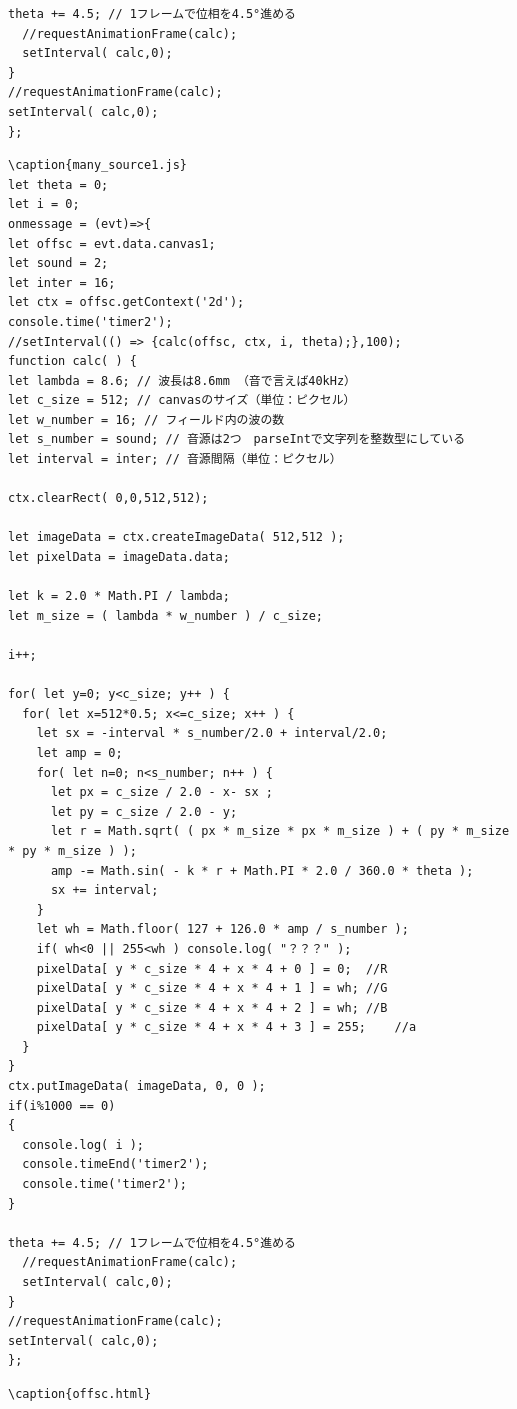 \documentclass[a4j,12pt]{jsarticle}
\begin{document}
{\begin{lstlisting}
theta += 4.5; // 1フレームで位相を4.5°進める
  //requestAnimationFrame(calc);
  setInterval( calc,0);
}
//requestAnimationFrame(calc);
setInterval( calc,0);
};

\end{lstlisting}
\newpage

\begin{lstlisting}
\caption{many_source1.js}
let theta = 0;
let i = 0;
onmessage = (evt)=>{
let offsc = evt.data.canvas1;
let sound = 2;
let inter = 16;
let ctx = offsc.getContext('2d');
console.time('timer2');
//setInterval(() => {calc(offsc, ctx, i, theta);},100);
function calc( ) {
let lambda = 8.6; // 波長は8.6mm （音で言えば40kHz）
let c_size = 512; // canvasのサイズ（単位：ピクセル）
let w_number = 16; // フィールド内の波の数
let s_number = sound; // 音源は2つ　parseIntで文字列を整数型にしている
let interval = inter; // 音源間隔（単位：ピクセル）

ctx.clearRect( 0,0,512,512);

let imageData = ctx.createImageData( 512,512 );
let pixelData = imageData.data;

let k = 2.0 * Math.PI / lambda;
let m_size = ( lambda * w_number ) / c_size;

i++;

for( let y=0; y<c_size; y++ ) {
  for( let x=512*0.5; x<=c_size; x++ ) {
    let sx = -interval * s_number/2.0 + interval/2.0;
    let amp = 0;
    for( let n=0; n<s_number; n++ ) {
      let px = c_size / 2.0 - x- sx ;
      let py = c_size / 2.0 - y;
      let r = Math.sqrt( ( px * m_size * px * m_size ) + ( py * m_size * py * m_size ) );
      amp -= Math.sin( - k * r + Math.PI * 2.0 / 360.0 * theta );
      sx += interval;
    }
    let wh = Math.floor( 127 + 126.0 * amp / s_number );
    if( wh<0 || 255<wh ) console.log( "？？？" );
    pixelData[ y * c_size * 4 + x * 4 + 0 ] = 0;  //R
    pixelData[ y * c_size * 4 + x * 4 + 1 ] = wh; //G
    pixelData[ y * c_size * 4 + x * 4 + 2 ] = wh; //B
    pixelData[ y * c_size * 4 + x * 4 + 3 ] = 255;    //a
  }
}
ctx.putImageData( imageData, 0, 0 );
if(i%1000 == 0)
{
  console.log( i );
  console.timeEnd('timer2');
  console.time('timer2');
}

theta += 4.5; // 1フレームで位相を4.5°進める
  //requestAnimationFrame(calc);
  setInterval( calc,0);
}
//requestAnimationFrame(calc);
setInterval( calc,0);
};

\end{lstlisting}
\newpage

\begin{lstlisting}
\caption{offsc.html}
\end{lstlisting}
\newpage

}
\end{document}
